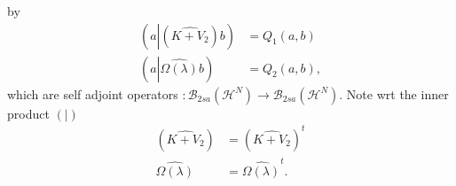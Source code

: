 \documentclass[aps,preprint]{revtex4}%
\begin{document}
by
\begin{align}
\left(  a\left\vert \left(  \widehat{K+V_{2}}\right)  \right.  b\right)   &
=Q_{1}\left(  a,b\right) \nonumber\\
\left(  a\left\vert \widehat{\Omega\left(  \lambda\right)  }\right.  b\right)
&  =Q_{2}\left(  a,b\right)  ,
\end{align}
which are self adjoint operators $:\mathcal{B}_{2sa}\left(  \mathcal{H}%
^{N}\right)  \rightarrow\mathcal{B}_{2sa}\left(  \mathcal{H}^{N}\right)  .$
Note wrt the inner product $\left(  |\right)  $
\begin{align}
\left(  \widehat{K+V_{2}}\right)   &  =\left(  \widehat{K+V_{2}}\right)
^{t}\\
\widehat{\Omega\left(  \lambda\right)  }  &  =\widehat{\Omega\left(
\lambda\right)  }^{t}.
\end{align}
\end{document}
